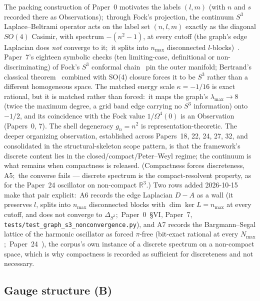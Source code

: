 \documentclass[11pt,a4paper]{article}
\theoremstyle{plain}
\theoremstyle{definition}
\newcommand{\sphere}[1]{S^{#1}}
\begin{document}
The packing construction of Paper~0 motivates the labels $(l,m)$ (with $n$ and $s$ recorded there as Observations);\ through Fock's projection, the continuum $\sphere{3}$ Laplace--Beltrami operator acts on the label set $(n,l,m)$ exactly as the diagonal $SO(4)$ Casimir, with spectrum $-(n^2 - 1)$, at every cutoff (the graph's edge Laplacian does \emph{not} converge to it;\ it splits into $n_{\max}$ disconnected $l$-blocks)~\cite{paper0,paper7}. Paper~7's eighteen symbolic checks (ten limiting-case, definitional or non-discriminating) of Fock's $\sphere{3}$ conformal chain~\cite{paper7} pin the outer manifold; Bertrand's classical theorem~\cite{bertrand1873} combined with SO(4) closure forces it to be $\sphere{3}$ rather than a different homogeneous space. The matched energy scale $\kappa = -1/16$ is exact rational, but it is matched rather than forced:\ it maps the graph's $\lambda_{\max} \to 8$ (twice the maximum degree, a grid band edge carrying no $\sphere{3}$ information) onto $-1/2$, and its coincidence with the Fock value $1/\Omega^4(0)$ is an Observation (Papers~0, 7). The shell degeneracy $g_n = n^2$ is representation-theoretic. The deeper organizing observation, established across Papers~18, 22, 24, 27, 32, and consolidated in the structural-skeleton scope pattern, is that the framework's discrete content lies in the closed/compact/Peter--Weyl regime; the continuum is what remains when compactness is released. (Compactness forces discreteness, A5;\ the converse fails --- discrete spectrum is the compact-resolvent property, as for the Paper~24 oscillator on non-compact $\mathbb{R}^3$.) Two rows added 2026-10-15 make that pair explicit:\ A6 records the edge Laplacian $D-A$ as a wall (it preserves $l$, splits into $n_{\max}$ disconnected blocks with $\dim\ker L = n_{\max}$ at every cutoff, and does not converge to $\Delta_{S^3}$;\ Paper~0~\S VI, Paper~7, \texttt{tests/test\_graph\_s3\_nonconvergence.py}), and A7 records the Bargmann--Segal lattice of the harmonic oscillator as forced $\pi$-free (bit-exact rational at every $N_{\max}$;\ Paper~24~\cite{paper24}), the corpus's own instance of a discrete spectrum on a non-compact space, which is why compactness is recorded as sufficient for discreteness and not necessary.

\subsection{Gauge structure (B)}
\label{sec:forced_gauge}
\end{document}
